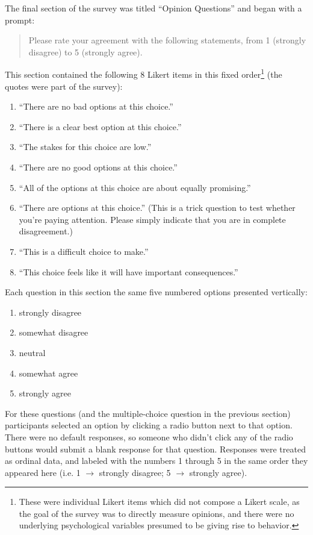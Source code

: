 The final section of the survey was titled ``Opinion Questions'' and began with a prompt:
%
\begin{quote}
Please rate your agreement with the following statements, from 1 (strongly disagree) to 5 (strongly agree).
\end{quote}
%
This section contained the following 8 Likert items in this fixed order\footnote{These were individual Likert items which did not compose a Likert scale, as the goal of the survey was to directly measure opinions, and there were no underlying psychological variables presumed to be giving rise to behavior.} (the quotes were part of the survey):
%
\begin{enumerate}
  \item ``There are no bad options at this choice.''
  \item ``There is a clear best option at this choice.''
  \item ``The stakes for this choice are low.''
  \item ``There are no good options at this choice.''
  \item ``All of the options at this choice are about equally promising.''
  \item ``There are options at this choice.'' (This is a trick question to test whether you're paying attention. Please simply indicate that you are in complete disagreement.)
  \item ``This is a difficult choice to make.''
  \item ``This choice feels like it will have important consequences.''
\end{enumerate}
%
Each question in this section the same five numbered options presented vertically:
%
\begin{enumerate}
  \item strongly disagree
  \item somewhat disagree
  \item neutral
  \item somewhat agree
  \item strongly agree
\end{enumerate}
%
For these questions (and the multiple-choice question in the previous section) participants selected an option by clicking a radio button next to that option. There were no default responses, so someone who didn't click any of the radio buttons would submit a blank response for that question.
%
Responses were treated as ordinal data, and labeled with the numbers 1 through 5 in the same order they appeared here (i.e. 1 $\rightarrow$ strongly disagree; 5 $\rightarrow$ strongly agree).


